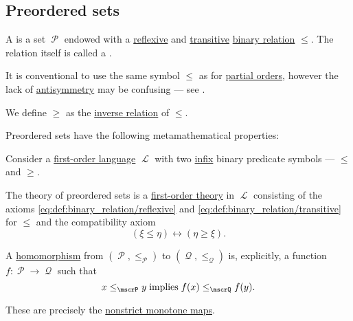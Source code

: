\subsection{Preordered sets}\label{subsec:preordered_sets}

\begin{definition}\label{def:preordered_set}
  A  is a set \( \mscrP \) endowed with a \hyperref[def:binary_relation/reflexive]{reflexive} and \hyperref[def:binary_relation/transitive]{transitive} \hyperref[def:binary_relation]{binary relation} \( \leq \). The relation itself is called a .

  It is conventional to use the same symbol \( \leq \) as for \hyperref[def:partially_ordered_set]{partial orders}, however the lack of \hyperref[def:binary_relation/antisymmetric]{antisymmetry} may be confusing --- see .

  We define \( \geq \) as the \hyperref[def:binary_relation/converse]{inverse relation} of \( \leq \).

  Preordered sets have the following metamathematical properties:
  \begin{thmenum}
     Consider a \hyperref[def:first_order_language]{first-order language} \( \mscrL \) with two \hyperref[rem:first_order_formula_conventions/infix]{infix} binary predicate symbols --- \( \leq \) and \( \geq \).

    The theory of preordered sets is a \hyperref[def:first_order_theory]{first-order theory} in \( \mscrL \) consisting of the axioms \eqref{eq:def:binary_relation/reflexive} and \eqref{eq:def:binary_relation/transitive} for \( \leq \) and the compatibility axiom
    \begin{equation}\label{eq:def:preordered_set/theory}
      (\xi \leq \eta) \leftrightarrow (\eta \geq \xi).
    \end{equation}

     A \hyperref[def:first_order_homomorphism]{homomorphism} from \( (\mscrP, \leq_\mscrP) \) to \( (\mscrQ, \leq_\mscrQ) \) is, explicitly, a function \( f: \mscrP \to \mscrQ \) such that
    \begin{equation*}
      x \leq_\mscrP y \T{implies} f(x) \leq_\mscrQ f(y).
    \end{equation*}

    These are precisely the \hyperref[eq:def:partially_ordered_set/homomorphism/nonstrict]{nonstrict monotone maps}.


\end{thmenum}
\end{definition}
